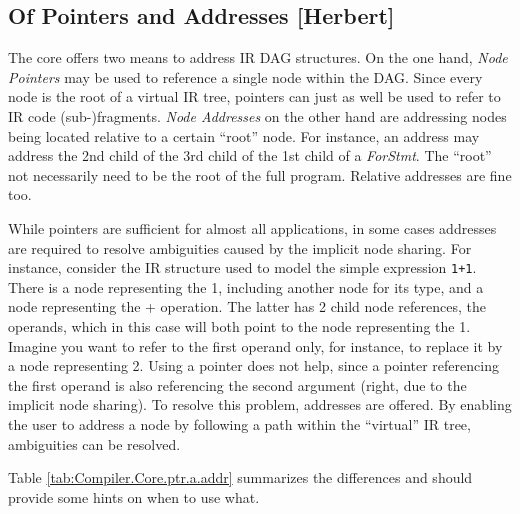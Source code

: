 \subsection{Of Pointers and Addresses [Herbert]}
\label{sec:Compiler.Core.PointersAndAddresses}

The core offers two means to address IR DAG structures. On the one hand,
\textit{Node Pointers} may be used to reference a single node within the DAG.
Since every node is the root of a virtual IR tree, pointers can just as well be
used to refer to IR code (sub-)fragments. \textit{Node Addresses} on the other
hand are addressing nodes being located relative to a certain ``root'' node. For
instance, an address may address the 2nd child of the 3rd child of the 1st child
of a \textit{ForStmt}. The ``root'' not necessarily need to be the root of the
full program. Relative addresses are fine too.


While pointers are sufficient for almost all applications, in some cases
addresses are required to resolve ambiguities caused by the implicit node
sharing. For instance, consider the IR structure used to model the simple
expression \lstinline|1+1|. There is a node representing the 1, including
another node for its type, and a node representing the + operation. The latter
has 2 child node references, the operands, which in this case will both point to
the node representing the 1. Imagine you want to refer to the first operand
only, for instance, to replace it by a node representing 2. Using a pointer does
not help, since a pointer referencing the first operand is also referencing the
second argument (right, due to the implicit node sharing). To resolve this
problem, addresses are offered. By enabling the user to address a node by
following a path within the ``virtual'' IR tree, ambiguities can be resolved.


Table \ref{tab:Compiler.Core.ptr.a.addr} summarizes the differences and
should provide some hints on when to use what.

